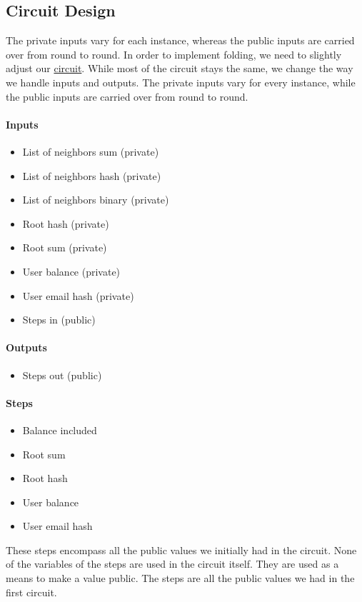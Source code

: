 \subsection{Circuit Design}
The private inputs vary for each instance, whereas the public inputs are carried over from round to round.
In order to implement folding, we need to slightly adjust our \hyperref[subsec:pi]{circuit}. While most of the circuit stays the same, we change the way we handle inputs and outputs.
The private inputs vary for every instance, while the public inputs are carried over from round to round.

\paragraph{Inputs}
\begin{itemize}

   \item List of neighbors sum (private)
   \item List of neighbors hash (private)
   \item List of neighbors binary (private)
   \item Root hash (private)
   \item Root sum (private)
   \item User balance (private)
   \item User email hash (private)
   \item Steps in (public)
  
   \end{itemize}

\paragraph{Outputs}
\begin{itemize}
   \item Steps out (public)
   \end{itemize}

\paragraph{Steps}
\begin{itemize}
   \item Balance included
   \item Root sum
   \item Root hash
   \item User balance
   \item User email hash
   \end{itemize}
These steps encompass all the public values we initially had in the circuit.
None of the variables of the steps are used in the circuit itself. They are used as a means to make a value public.
The steps are all the public values we had in the first circuit.

